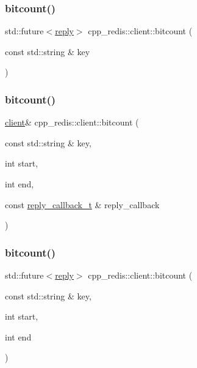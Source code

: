 \mbox{\label{classcpp__redis_1_1client_ac667b96661726874bc237c84de1ddd89}} 
\subsubsection{\texorpdfstring{bitcount()}{bitcount()}\hspace{0.1cm}{\footnotesize\ttfamily [2/4]}}
{\footnotesize\ttfamily std\+::future$<$\hyperlink{classcpp__redis_1_1reply}{reply}$>$ cpp\+\_\+redis\+::client\+::bitcount (\begin{DoxyParamCaption}\item[{const std\+::string \&}]{key }\end{DoxyParamCaption})}

\mbox{\label{classcpp__redis_1_1client_ac631a06c8b69a2f1b4de3aabc19d68e2}} 
\subsubsection{\texorpdfstring{bitcount()}{bitcount()}\hspace{0.1cm}{\footnotesize\ttfamily [3/4]}}
{\footnotesize\ttfamily \hyperlink{classcpp__redis_1_1client}{client}\& cpp\+\_\+redis\+::client\+::bitcount (\begin{DoxyParamCaption}\item[{const std\+::string \&}]{key,  }\item[{int}]{start,  }\item[{int}]{end,  }\item[{const \hyperlink{classcpp__redis_1_1client_a061a1140d36d2eaeda82b09a0bb3f9f2}{reply\+\_\+callback\+\_\+t} \&}]{reply\+\_\+callback }\end{DoxyParamCaption})}

\mbox{\label{classcpp__redis_1_1client_af2d2dc1c19d735e84d8e2725fb98dbda}} 
\subsubsection{\texorpdfstring{bitcount()}{bitcount()}\hspace{0.1cm}{\footnotesize\ttfamily [4/4]}}
{\footnotesize\ttfamily std\+::future$<$\hyperlink{classcpp__redis_1_1reply}{reply}$>$ cpp\+\_\+redis\+::client\+::bitcount (\begin{DoxyParamCaption}\item[{const std\+::string \&}]{key,  }\item[{int}]{start,  }\item[{int}]{end }\end{DoxyParamCaption})}

